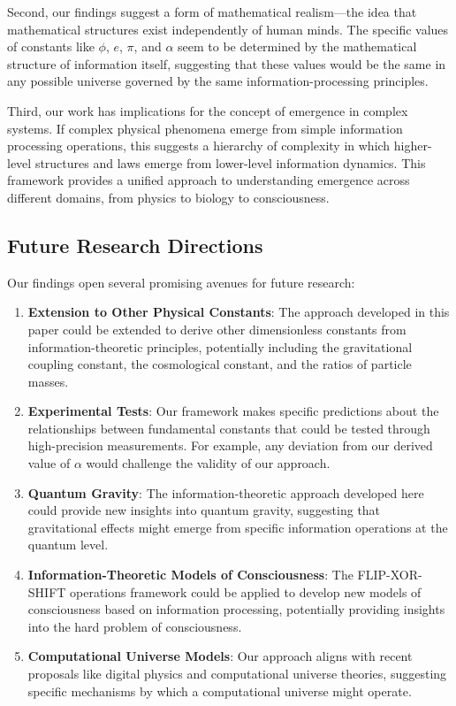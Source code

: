 Second, our findings suggest a form of mathematical realism—the idea that mathematical structures exist independently of human minds. The specific values of constants like $\phi$, $e$, $\pi$, and $\alpha$ seem to be determined by the mathematical structure of information itself, suggesting that these values would be the same in any possible universe governed by the same information-processing principles.

Third, our work has implications for the concept of emergence in complex systems. If complex physical phenomena emerge from simple information processing operations, this suggests a hierarchy of complexity in which higher-level structures and laws emerge from lower-level information dynamics. This framework provides a unified approach to understanding emergence across different domains, from physics to biology to consciousness.

\subsection{Future Research Directions}

Our findings open several promising avenues for future research:

\begin{enumerate}
    \item \textbf{Extension to Other Physical Constants}: The approach developed in this paper could be extended to derive other dimensionless constants from information-theoretic principles, potentially including the gravitational coupling constant, the cosmological constant, and the ratios of particle masses.
    
    \item \textbf{Experimental Tests}: Our framework makes specific predictions about the relationships between fundamental constants that could be tested through high-precision measurements. For example, any deviation from our derived value of $\alpha$ would challenge the validity of our approach.
    
    \item \textbf{Quantum Gravity}: The information-theoretic approach developed here could provide new insights into quantum gravity, suggesting that gravitational effects might emerge from specific information operations at the quantum level.
    
    \item \textbf{Information-Theoretic Models of Consciousness}: The FLIP-XOR-SHIFT operations framework could be applied to develop new models of consciousness based on information processing, potentially providing insights into the hard problem of consciousness.
    
    \item \textbf{Computational Universe Models}: Our approach aligns with recent proposals like digital physics and computational universe theories, suggesting specific mechanisms by which a computational universe might operate.
\end{enumerate}

